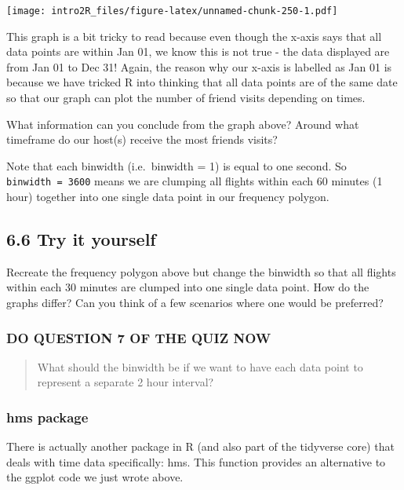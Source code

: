 \documentclass[
]{book}
\begin{document}
\texttt{[image: intro2R\_files/figure-latex/unnamed-chunk-250-1.pdf]}

This graph is a bit tricky to read because even though the x-axis says that all data points are within Jan 01, we know this is not true - the data displayed are from Jan 01 to Dec 31! Again, the reason why our x-axis is labelled as Jan 01 is because we have tricked R into thinking that all data points are of the same date so that our graph can plot the number of friend visits depending on times.

What information can you conclude from the graph above? Around what timeframe do our host(s) receive the most friends visits?

Note that each binwidth (i.e.~binwidth = 1) is equal to one second. So \texttt{binwidth\ =\ 3600} means we are clumping all flights within each 60 minutes (1 hour) together into one single data point in our frequency polygon.

\hypertarget{try-it-yourself-33}{%
\subsection{6.6 Try it yourself}\label{try-it-yourself-33}}

Recreate the frequency polygon above but change the binwidth so that all flights within each 30 minutes are clumped into one single data point. How do the graphs differ? Can you think of a few scenarios where one would be preferred?

\hypertarget{do-question-7-of-the-quiz-now-1}{%
\subsubsection{DO QUESTION 7 OF THE QUIZ NOW}\label{do-question-7-of-the-quiz-now-1}}

\begin{quote}
What should the binwidth be if we want to have each data point to represent a separate 2 hour interval?
\end{quote}

\hypertarget{hms-package}{%
\subsubsection{hms package}\label{hms-package}}

There is actually another package in R (and also part of the tidyverse core) that deals with time data specifically: hms. This function provides an alternative to the ggplot code we just wrote above.
\end{document}
